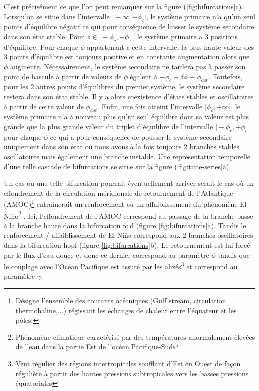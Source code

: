 C'est précisément ce que l'on peut remarquer sur la figure (\ref{fig:bifurcations}c). Lorsqu'on se situe dans l'intervalle $]-\infty, -\phi_c[$, le système primaire n'a qu'un seul points d'équilibre négatif ce qui pour conséquence de laisser le système secondaire dans son état stable. Pour $\phi \in ]-\phi_c, +\phi_c[$, le système primaire a 3 positions d'équilibre. Pour chaque $\phi$ appartenant à cette intervalle, la plus haute valeur des 3 points d'équilibre est toujours positive et en constante augmentation alors que $\phi$ augmente. Nécessairement, le système secondaire ne tardera pas à passer son point de bascule à partir de valeurs de $\phi$ égalent à $-\phi_c + \delta \phi \equiv \phi_{ast}$. Toutefois, pour les 2 autres points d'équilibres du premier système, le système secondaire restera dans son état stable. Il y a alors coexistence d'états stables et oscillatoires à partir de cette valeur de $\phi_{ast}$. Enfin, une fois atteint l'intervalle $]\phi_c, +\infty[$, le système primaire n'a à nouveau plus qu'un seul équilibre dont sa valeur est plus grande que la plus grande valeur du triplet d'équilibre de l'intervalle $]-\phi_c, +\phi_c$ pour chaque $\phi$ ce qui a pour conséquence de pousser le système secondaire uniquement dans son état où nous avons à la fois toujours 2 branches stables oscillatoires mais également une branche instable. Une représentation temporelle d'une telle cascade de bifurcations se situe sur la figure (\ref{fig:time-series}a).

Un cas où une telle bifurcation pourrait éventuellement arriver serait le cas où un effondrement de la circulation méridionale de retournement de l'Atlantique (AMOC)\footnote{Désigne l'ensemble des courants océaniques (Gulf stream, circulation thermohaline,...) régissant les échanges de chaleur entre l'équateur et les pôles.} entraînerait un renforcement ou un affaiblissement du phénomène El-Niño\footnote{Phénomène climatique caractérisé par des températures anormalement élevées de l'eau dans la partie Est de l'océan Pacifique-Sud} \cite{timmermann_influence_2007}. Ici, l'effondrement de l'AMOC correspond au passage de la branche basse à la branche haute dans la bifurcation fold (figure \ref{fig:bifurcations}a). Tandis le renforcement / affaiblissement de El-Niño correspond aux 2 branches oscillatoires dans la bifurcation hopf (figure \ref{fig:bifurcations}b). Le retournement est lui forcé par le flux d'eau douce et donc ce dernier correspond au paramètre $\phi$ tandis que le couplage avec l'Océan Pacifique est assuré par les alizés\footnote{Vent régulier des régions intertropicales soufflant d'Est en Ouest de façon régulière à partir des hautes pressions subtropicales vers les basses pressions équatoriales} et correspond au paramètre $\gamma$.


